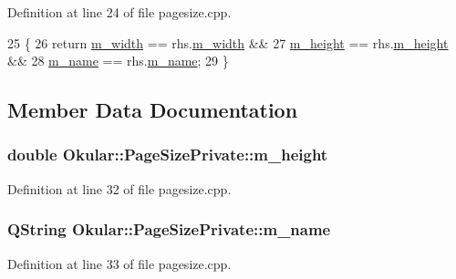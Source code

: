 Definition at line 24 of file pagesize.\+cpp.


\begin{DoxyCode}
25         \{
26             \textcolor{keywordflow}{return} \hyperlink{classOkular_1_1PageSizePrivate_a584076036562280f8d6c2819abeda0c6}{m\_width} == rhs.\hyperlink{classOkular_1_1PageSizePrivate_a584076036562280f8d6c2819abeda0c6}{m\_width} &&
27                    \hyperlink{classOkular_1_1PageSizePrivate_a250e1594686902033927d7369eb0d69b}{m\_height} == rhs.\hyperlink{classOkular_1_1PageSizePrivate_a250e1594686902033927d7369eb0d69b}{m\_height} &&
28                    \hyperlink{classOkular_1_1PageSizePrivate_a28dc277bc4476684a305a6f87cefb518}{m\_name} == rhs.\hyperlink{classOkular_1_1PageSizePrivate_a28dc277bc4476684a305a6f87cefb518}{m\_name};
29         \}
\end{DoxyCode}


\subsection{Member Data Documentation}
\hypertarget{classOkular_1_1PageSizePrivate_a250e1594686902033927d7369eb0d69b}{
\subsubsection[{m\+\_\+height}]{\setlength{\rightskip}{0pt plus 5cm}double Okular\+::\+Page\+Size\+Private\+::m\+\_\+height}}\label{classOkular_1_1PageSizePrivate_a250e1594686902033927d7369eb0d69b}


Definition at line 32 of file pagesize.\+cpp.

\hypertarget{classOkular_1_1PageSizePrivate_a28dc277bc4476684a305a6f87cefb518}{
\subsubsection[{m\+\_\+name}]{\setlength{\rightskip}{0pt plus 5cm}Q\+String Okular\+::\+Page\+Size\+Private\+::m\+\_\+name}}\label{classOkular_1_1PageSizePrivate_a28dc277bc4476684a305a6f87cefb518}


Definition at line 33 of file pagesize.\+cpp.

